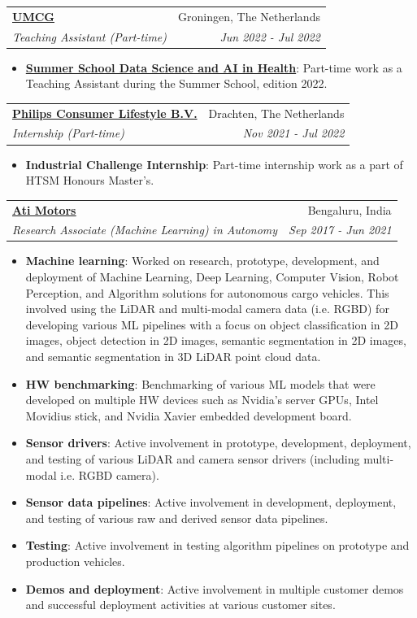 \documentclass[letterpaper,12pt]{article}
\makeatletter
\newcommand{\resumeItem}[2]{
    \item\small{
        \textbf{#1}{: #2 \vspace{-2pt}}
    }
}
\newcommand{\resumeSubheading}[4]{
    \vspace{-1pt}\item
    \begin{tabular*}{0.97\textwidth}{l@{\extracolsep{\fill}}r}
        \textbf{#1} & #2 \\
        \textit{\small#3} & \textit{\small #4} \\
    \end{tabular*}\vspace{-5pt}
}
\newcommand{\resumeSubHeadingListStart}{\begin{itemize}[leftmargin=*]}
\newcommand{\resumeSubHeadingListEnd}{\end{itemize}}
\makeatother
\begin{document}
        \resumeSubheading{\underline{\href{https://www.umcg.nl/}{UMCG}}}{Groningen, The Netherlands}{Teaching Assistant (Part-time)}{Jun 2022 - Jul 2022}
            \resumeSubHeadingListStart
                \resumeItem{\href{https://www.rug.nl/research/gradschool-medical-sciences/summer-schools/data-science-and-ai/}{Summer School Data Science and AI in Health}}{Part-time work as a Teaching Assistant during the Summer School, edition 2022.}
            \resumeSubHeadingListEnd

        \resumeSubheading{\underline{{Philips Consumer Lifestyle B.V.}}}{Drachten, The Netherlands}{Internship (Part-time)}{Nov 2021 - Jul 2022}
            \resumeSubHeadingListStart
                \resumeItem{{Industrial Challenge Internship}}{Part-time internship work as a part of HTSM Honours Master's.}
            \resumeSubHeadingListEnd

        \resumeSubheading{\underline{\href{https://www.atimotors.com/}{Ati Motors}}}{Bengaluru, India}{Research Associate (Machine Learning) in Autonomy}{Sep 2017 - Jun 2021}
            \resumeSubHeadingListStart
                \resumeItem{Machine learning}
                {Worked on research, prototype, development, and deployment of Machine Learning, Deep Learning, Computer Vision, Robot Perception, and Algorithm solutions for autonomous cargo vehicles. This involved using the LiDAR and multi-modal camera data (i.e. RGBD) for developing various ML pipelines with a focus on object classification in 2D images, object detection in 2D images, semantic segmentation in 2D images, and semantic segmentation in 3D LiDAR point cloud data.}
                \resumeItem{HW benchmarking}{Benchmarking of various ML models that were developed on multiple HW devices such as Nvidia's server GPUs, Intel Movidius stick, and Nvidia Xavier embedded development board.}
                \resumeItem{Sensor drivers}{Active involvement in prototype, development, deployment, and testing of various LiDAR and camera sensor drivers (including multi-modal i.e. RGBD camera).}
                \resumeItem{Sensor data pipelines}{Active involvement in development, deployment, and testing of various raw and derived sensor data pipelines.}
                \resumeItem{Testing}{Active involvement in testing algorithm pipelines on prototype and production vehicles.}
                \resumeItem{Demos and deployment}{Active involvement in multiple customer demos and successful deployment activities at various customer sites.}
            \resumeSubHeadingListEnd
\end{document}
